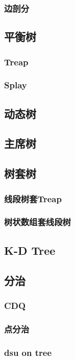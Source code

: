 \documentclass[twocolumn,a4]{article}
\newcommand{\addcpp}[1]{}
\begin{document}
		\subsubsection{边剖分}
	\subsection{平衡树}
		\subsubsection{Treap}
			\addcpp{datastruct/treap}
		\subsubsection{Splay}
	\subsection{动态树}
	\subsection{主席树}
	\subsection{树套树}
		\subsubsection{线段树套Treap}
			\addcpp{datastruct/seg_treap}
		\subsubsection{树状数组套线段树}
			\addcpp{datastruct/fenwick_seg}
	\subsection{K-D Tree}
	\subsection{分治}
		\subsubsection{CDQ}
		\subsubsection{点分治}
		\subsubsection{dsu on tree}
			\addcpp{datastruct/dsu_on_tree}
\end{document}
